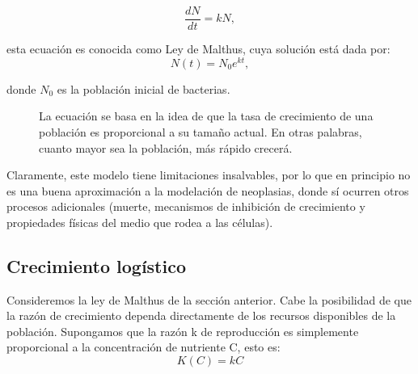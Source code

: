 \begin{equation}
    \frac{dN}{dt} = kN,
\end{equation}

esta ecuaci\'on es conocida como Ley de Malthus, cuya soluci\'on est\'a dada por:
\begin{equation}
    N(t) = N_{0}e^{kt},
\end{equation}

donde $N_{0}$ es la poblaci\'on inicial de bacterias.

\begin{figure}[!ht]
\begin{center}
\end{center}\vspace*{-0.6cm}
\caption[Imagen de Oncogenes. Falta poner leyenda]{La ecuación se basa en la idea de que la tasa de crecimiento de una población es proporcional a su tamaño actual. En otras palabras, cuanto mayor sea la población, más rápido crecerá.}
\label{fig-malthus}
\end{figure}

Claramente, este modelo tiene limitaciones insalvables, por lo que en principio no es una buena aproximación a la modelación de neoplasias, donde sí ocurren otros procesos adicionales (muerte, mecanismos de inhibición de crecimiento y propiedades físicas del medio que rodea a las células).

\subsection{Crecimiento logístico}
Consideremos la ley de Malthus de la sección anterior. Cabe la posibilidad de que la razón de crecimiento dependa directamente de los recursos disponibles de la población. Supongamos que la razón k de reproducción es simplemente proporcional a la concentración de nutriente C, esto es:
\begin{equation}
    K(C) = kC
\end{equation}

